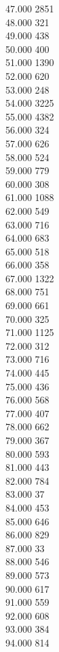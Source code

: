 { 47.000	2851 \\
 48.000	321 \\
 49.000	438 \\
 50.000	400 \\
 51.000	1390 \\
 52.000	620 \\
 53.000	248 \\
 54.000	3225 \\
 55.000	4382 \\
 56.000	324 \\
 57.000	626 \\
 58.000	524 \\
 59.000	779 \\
 60.000	308 \\
 61.000	1088 \\
 62.000	549 \\
 63.000	716 \\
 64.000	683 \\
 65.000	518 \\
 66.000	358 \\
 67.000	1322 \\
 68.000	751 \\
 69.000	661 \\
 70.000	325 \\
 71.000	1125 \\
 72.000	312 \\
 73.000	716 \\
 74.000	445 \\
 75.000	436 \\
 76.000	568 \\
 77.000	407 \\
 78.000	662 \\
 79.000	367 \\
 80.000	593 \\
 81.000	443 \\
 82.000	784 \\
 83.000	37 \\
 84.000	453 \\
 85.000	646 \\
 86.000	829 \\
 87.000	33 \\
 88.000	546 \\
 89.000	573 \\
 90.000	617 \\
 91.000	559 \\
 92.000	608 \\
 93.000	384 \\
 94.000	814 \\
}
